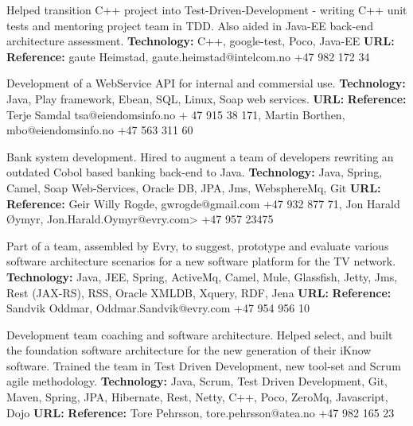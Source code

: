 \documentclass[11pt,a4paper,sans]{moderncv} %
\begin{document}
{
Helped transition C++ project into Test-Driven-Development
- writing C++ unit tests and mentoring project team in TDD. Also aided in Java-EE back-end architecture assessment.
\newline{}\textbf{Technology:} C++, google-test, Poco, Java-EE
\newline{}\textbf{URL:} 
\newline{}\textbf{Reference:} gaute Heimstad, gaute.heimstad@intelcom.no  +47 982 172 34
}

{
Development of a WebService API for internal and commersial use.
\newline{}\textbf{Technology:} Java, Play framework, Ebean, SQL, Linux, Soap web services.
\newline{}\textbf{URL:} 
\newline{}\textbf{Reference:} Terje Samdal tsa@eiendomsinfo.no + 47 915 38 171, Martin Borthen, mbo@eiendomsinfo.no +47 563 311 60
}

{
Bank system development. Hired to augment a team of developers rewriting an outdated Cobol based banking back-end to Java.
\newline{}\textbf{Technology:} Java, Spring, Camel, Soap Web-Services, Oracle DB, JPA, Jms, WebsphereMq, Git
\newline{}\textbf{URL:} 
\newline{}\textbf{Reference:} Geir Willy Rogde, gwrogde@gmail.com +47 932 877 71, Jon Harald Øymyr, Jon.Harald.Oymyr@evry.com> +47 957 23475
}

{
Part of a team, assembled by Evry, to suggest, prototype and evaluate various software architecture scenarios for a new software platform for	the TV network.
\newline{}\textbf{Technology:} Java, JEE, Spring, ActiveMq, Camel, Mule, Glassfish, Jetty, Jms, Rest (JAX-RS), RSS, Oracle XMLDB, Xquery, RDF, Jena
\newline{}\textbf{URL:} 
\newline{}\textbf{Reference:} Sandvik Oddmar, Oddmar.Sandvik@evry.com +47 954 956 10
}

{
Development team coaching and software architecture.
Helped select, and built the foundation  software architecture for the new generation of their iKnow software.
Trained the team in Test Driven Development, new tool-set and  Scrum agile methodology.
\newline{}\textbf{Technology:} Java,  Scrum,  Test Driven Development,  Git,  Maven,  Spring, JPA, Hibernate, Rest, Netty, C++, Poco, ZeroMq, Javascript, Dojo
\newline{}\textbf{URL:} 
\newline{}\textbf{Reference:} Tore Pehrsson,  tore.pehrsson@atea.no +47 982 165 23
}
\end{document}
